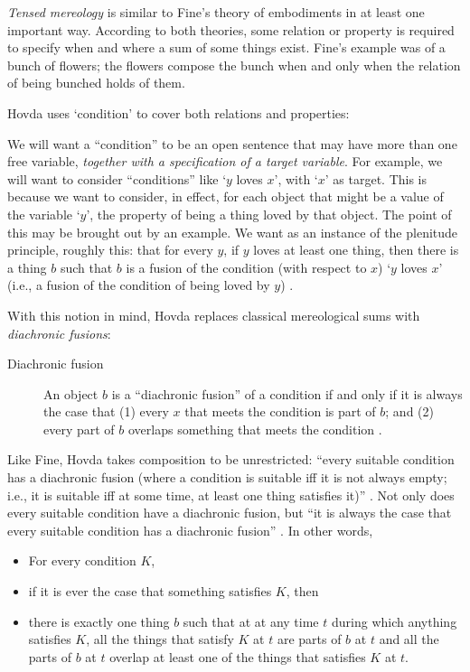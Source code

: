 \documentclass[12pt,twoside]{reedfancy}
\newenvironment{squote}{%
	\begin{spacing}{1}
	\begin{list}{}{%
	\setlength{\labelwidth}{0pt}%
	\rightmargin\leftmargin%
	}
	\item\relax
	}{%
	\end{list}%
	\end{spacing}
	}
\begin{document}
\begin{spacing}{1.25}
{\em Tensed mereology} is similar to Fine's theory of embodiments in
at least one important way.  According to both theories, some relation
or property is required to specify when and where a sum of some things
exist.  Fine's example was of a bunch of flowers; the flowers compose
the bunch when and only when the relation of being bunched holds of
them.

Hovda uses `condition' to cover both relations and properties:

\begin{squote}
We will want a ``condition'' to be an open sentence that may have more
than one free variable, \emph{together with a specification of a
  target variable}. For example, we will want to consider
``conditions'' like `$y$ loves $x$', with `$x$' as target.  This is
because we want to consider, in effect, for each object that might be
a value of the variable `$y$', the property of being a thing loved by
that object.  The point of this may be brought out by an example.  We
want as an instance of the plenitude principle, roughly this: that for
every $y$, if $y$ loves at least one thing, then there is a thing $b$
such that $b$ is a fusion of the condition (with respect to $x$) `$y$
loves $x$' (i.e., a fusion of the condition of being loved by $y$)
\citeyearpar[sec. 1.1n2]{hovda2011}.
\end{squote}

With this notion in mind, Hovda replaces classical mereological sums
with {\em diachronic fusions}:

\begin{description}
  \item[Diachronic fusion] An object $b$ is a ``diachronic fusion'' of
    a condition if and only if it is always the case that (1) every
    $x$ that meets the condition is part of $b$; and (2) every part of
    $b$ overlaps something that meets the condition
    \citeyearpar[sec. 1.1]{hovda2011}.
\end{description}

Like Fine, Hovda takes composition to be unrestricted: ``every
suitable condition has a diachronic fusion (where a condition is
suitable iff it is not always empty; i.e., it is suitable iff at some
time, at least one thing satisfies it)'' \citeyearpar[sec.
  3.1]{hovda2011}.  Not only does every suitable condition have a
diachronic fusion, but ``it is always the case that every suitable
condition has a diachronic fusion''
\citeyearpar[sec. 3.1.1]{hovda2011}.  In other words,

\begin{itemize}
  \item For every condition $K$,
  \item if it is ever the case that something satisfies $K$, then
  \item there is exactly one thing $b$ such that at at any time $t$
    during which anything satisfies $K$, all the things that satisfy
    $K$ at $t$ are parts of $b$ at $t$ and all the parts of $b$ at $t$
    overlap at least one of the things that satisfies $K$ at $t$.
\end{itemize}


\end{spacing}
\end{document}
